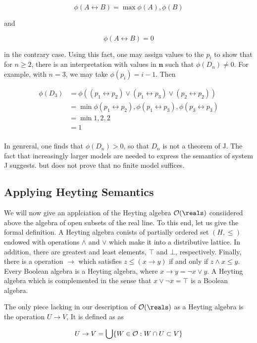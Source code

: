 $$
  \phi(A \leftrightarrow B) = \max \phi(A), \phi(B)
$$

and

$$
  \phi(A \leftrightarrow B) = 0
$$

in the contrary case.  Using this fact, one may assign values to the $p_i$ to show that for $n  \ge 2$, there is an interpretation with values in $\mathbf{n}$ such that  $\phi(D_n) \ne 0$.  For example, with $n = 3$, we may take $\phi(p_i) = i-1$.
Then

\begin{align}
\phi(D_3) &= \phi((p_1 \leftrightarrow p_2) \lor (p_1 \leftrightarrow p_3)\lor (p_2 \leftrightarrow p_2)) \\
  & = \min \phi(p_1 \leftrightarrow p_2), \phi(p_1 \leftrightarrow p_3), \phi(p_3 \leftrightarrow p_3) \\
  & = \min 1, 2, 2 \\
 & = 1 \\
\end{align}

In genreral, one finds that $\phi(D_n) > 0$, so that  $D_n$ is not a theorem of J.
The fact that increasingly larger models are needed to express the semantics of system J suggests. but does not prove that no finite model suffices.

\subsection{Applying Heyting Semantics}

We will now give an applciation of the Heyting algebra $\opensets(\reals)$ consiidered above \mdash the algebra of open subsets of the real line.  To this end, let us give the formal definition. A Heyting algebra conists of partially ordered set $(H, \le)$ endowed with operations $\land$ and $\lor$ which make it into a distributive lattice.  In addition, there are greatest and least elements, $\top$ and $\bot$, respectively.  Finally, there is a operation $\to$ which satisfies $z \le (x \to y)$ if and only if $z \land x \le y$.  Every Boolean algebra is a Heyting algebra, where $x \to y = \neg x \lor y$.  A Heyting algebra which is complemented in the sense that $x \lor \neg x = \top$ is a Boolean algebra.

The only piece lacking in our description of  $\opensets(\reals)$ as a Heyting algebra
is the operation $U \to V$,  It is defined as as

$$
U \to V = \bigcup \{ W\in \mathcal{O} : W \cap U \subset V  \}
$$

